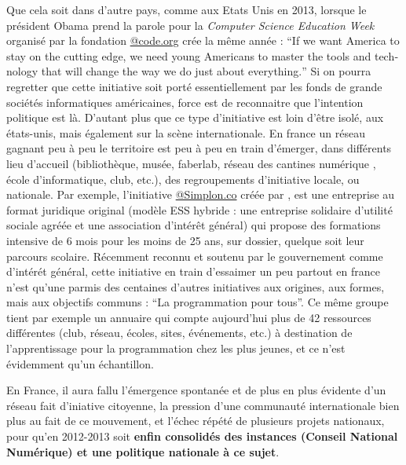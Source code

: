 Que cela soit dans d'autre pays, comme aux Etats Unis en 2013, lorsque le président Obama prend la parole pour la \textit{Computer Science Education Week} organisé par la fondation \href{http://code.org}{@code.org} crée la même année : \foreignquote{english}{If we want America to stay on the cutting edge, we need young Americans to master the tools and technology that will change the way we do just about everything.} Si on pourra regretter que cette initiative soit porté essentiellement par les fonds de grande sociétés informatiques américaines, force est de reconnaitre que l'intention politique est là. D'autant plus que ce type d'initiative est loin d'être isolé, aux états-unis, mais également sur la scène internationale. En france un réseau gagnant peu à peu le territoire est peu à peu en train d'émerger, dans différents lieu d'accueil (bibliothèque, musée, faberlab, réseau des cantines numérique , école d'informatique, club, etc.), des regroupements d'initiative locale, ou nationale. Par exemple, l'initiative \href{http://Simplon.co}{@Simplon.co}  créée par \textcite{Bardeau2014}, est une entreprise au format juridique original (modèle ESS hybride : une entreprise solidaire d’utilité sociale agréée et une association d’intérêt général) qui propose des formations intensive de 6 mois pour les moins de 25 ans, sur dossier, quelque soit leur parcours scolaire. Récemment reconnu et soutenu par le gouvernement comme d'intérét général, cette initiative en train d'essaimer un peu partout en france n'est qu'une parmis des centaines d'autres initiatives aux origines, aux formes, mais aux objectifs communs : \enquote{La programmation pour tous}. Ce même groupe tient par exemple un annuaire \autocite{Simplon2015} qui compte aujourd'hui plus de 42 ressources différentes (club, réseau, écoles, sites, événements, etc.) à destination de l'apprentissage pour la programmation chez les plus jeunes, et ce n'est évidemment qu'un échantillon.

En France, il aura fallu l'émergence spontanée et de plus en plus évidente d'un réseau fait d'iniative citoyenne, la pression d'une communauté internationale bien plus au fait de ce mouvement, et l'échec répété de plusieurs projets nationaux, pour qu'en 2012-2013 soit \textbf{ enfin consolidés des instances (Conseil National Numérique) et une politique nationale à ce sujet}.

